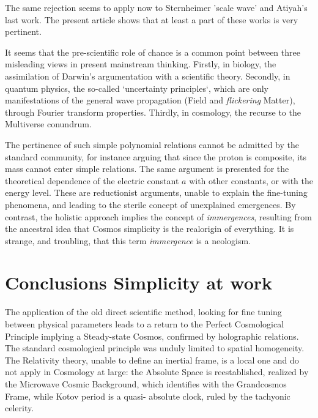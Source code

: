 \documentclass[twoside,draft]{article}
\begin{document}
\begin{sloppypar}
{The same rejection seems to apply now to Sternheimer 'scale wave' and Atiyah's last work. The present article shows that at
least a part of these works is very pertinent.

It seems that the pre-scientific role of chance is a common point between three misleading views
in present mainstream thinking. Firstly, in biology, the assimilation of Darwin's argumentation
with a scientific theory. Secondly, in quantum physics, the so-called `uncertainty principles`, which are
only manifestations of the general wave propagation (Field and \textit{flickering} Matter), through Fourier
transform properties. Thirdly, in cosmology, the recurse to the Multiverse conundrum.

The pertinence of such simple polynomial relations cannot be admitted by the standard community, for instance arguing that since the proton is composite, its mass cannot enter simple relations. The same argument is presented for the theoretical dependence of the electric constant $a$ with other constants, or with the energy level. These are reductionist arguments, unable to explain the fine-tuning phenomena, and leading to the sterile concept of unexplained emergences. By contrast, the holistic approach implies the concept of \textit{immergences}, resulting from the ancestral idea that Cosmos simplicity is the realorigin of everything. It is strange, and troubling, that this term \textit{immergence} is a neologism. 


\section {Conclusions Simplicity at work}

The application of the old direct scientific method, looking for fine tuning between physical
parameters leads to a return to the Perfect Cosmological Principle implying a Steady-state Cosmos,
confirmed by holographic relations. The standard cosmological principle was unduly limited to
spatial homogeneity. The Relativity theory, unable to define an inertial frame, is a local one and do
not apply in Cosmology at large: the Absolute Space is reestablished, realized by the Microwave
Cosmic Background, which identifies with the Grandcosmos Frame, while Kotov period is a quasi-
absolute clock, ruled by the tachyonic celerity.

}
\end{sloppypar}
\end{document}
